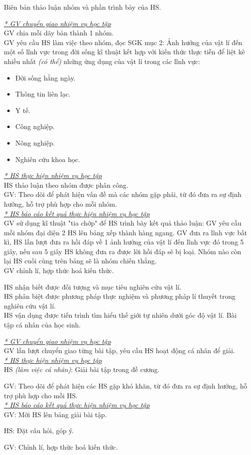 {Biên bản thảo luận nhóm và phần trình bày của HS.

}
{
	\textit{\underline{
* GV chuyển giao nhiệm vụ học tập	
}}\\
GV chia mỗi dãy bàn thành 1 nhóm.\\
GV yêu cầu HS làm việc theo nhóm, đọc SGK mục 2: Ảnh hưởng của vật lí đến một số lĩnh vực trong đời sống kĩ thuật kết hợp với kiến thức thực tiễn để liệt kê nhiều nhất \textit{(có thể)} những ứng dụng của vật lí trong các lĩnh vực:
\begin{itemize}
	\item Đời sống hằng ngày.
	\item Thông tin liên lạc.
	\item Y tế.
	\item Công nghiệp.
	\item Nông nghiệp.
	\item Nghiên cứu khoa học.
\end{itemize}
\textit{\underline{
* HS thực hiện nhiệm vụ học tập
}}\\
HS thảo luận theo nhóm được phân công.\\
GV: Theo dõi để phát hiện vấn đề mà các nhóm gặp phải, từ đó đưa ra sự định hướng, hỗ trợ phù hợp cho mỗi nhóm.\\
\textit{\underline{
		* HS báo cáo kết quả thực hiện nhiệm vụ học tập
}}\\
GV sử dụng kĩ thuật "tia chớp" để HS trình bày kết quả thảo luận: GV yêu cầu mỗi nhóm đại diện 2 HS lên bảng xếp thành hàng ngang. GV đưa ra lĩnh vực bất kì, HS lần lượt đưa ra hồi đáp về 1 ảnh hưởng của vật lí đến lĩnh vực đó trong 5 giây, nếu sau 5 giây HS không đưa ra được lời hồi đáp sẽ bị loại. Nhóm nào còn lại HS cuối cùng trên bảng sẽ là nhóm chiến thắng.\\
GV chỉnh lí, hợp thức hoá kiến thức.
}
{ HS nhận biết được đối tượng và mục tiêu nghiên cứu vật lí.\\
	HS phân biệt được phương pháp thực nghiệm và phương pháp lí thuyết trong nghiên cứu vật lí.\\
	HS vận dụng được tiến trình tìm hiểu thế giới tự nhiên dưới góc độ vật lí.
}
{
	Bài tập cá nhân của học sinh.
}
{
	\textit{\underline{* GV chuyển giao nhiệm vụ học tập}}\\
	GV lần lượt chuyển giao từng bài tập, yêu cầu HS hoạt động cá nhân để giải.\\
	\textit{\underline{* HS thực hiện nhiệm vụ học tập}}\\
	HS \textit{(làm việc cá nhân)}:  Giải bài tập trong đề cương. 
	
	GV: Theo dõi để phát hiện các HS gặp khó khăn, từ đó đưa ra sự định hướng, hỗ trợ phù hợp cho mỗi HS.\\
	\textit{\underline{* HS báo cáo kết quả thực hiện nhiệm vụ học tập}}\\
	GV: Mời HS lên bảng giải bài tập.
	
	HS: Đặt câu hỏi, góp ý.
	
	GV: Chỉnh lí, hợp thức hoá kiến thức.
}

